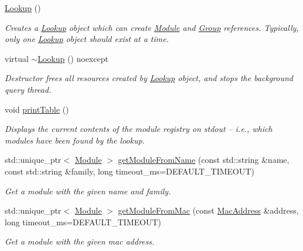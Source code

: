 \begin{DoxyCompactItemize}
\item 
\hyperlink{classhebi_1_1Lookup_acdfa87d652dd197ff578e5ea0f25128c}{Lookup} ()
\begin{DoxyCompactList}\small\item\em Creates a \hyperlink{classhebi_1_1Lookup}{Lookup} object which can create \hyperlink{classhebi_1_1Module}{Module} and \hyperlink{classhebi_1_1Group}{Group} references. Typically, only one \hyperlink{classhebi_1_1Lookup}{Lookup} object should exist at a time. \end{DoxyCompactList}\item 
\mbox{\label{classhebi_1_1Lookup_a7d9e38f258c85bedfd63c71c41d1bd8b}} 
virtual \hyperlink{classhebi_1_1Lookup_a7d9e38f258c85bedfd63c71c41d1bd8b}{$\sim$\+Lookup} () noexcept
\begin{DoxyCompactList}\small\item\em Destructor frees all resources created by \hyperlink{classhebi_1_1Lookup}{Lookup} object, and stops the background query thread. \end{DoxyCompactList}\item 
void \hyperlink{classhebi_1_1Lookup_a52e3d10c45ac8b6c47a7944fee1d7189}{print\+Table} ()
\begin{DoxyCompactList}\small\item\em Displays the current contents of the module registry on stdout -- i.\+e., which modules have been found by the lookup. \end{DoxyCompactList}\item 
std\+::unique\+\_\+ptr$<$ \hyperlink{classhebi_1_1Module}{Module} $>$ \hyperlink{classhebi_1_1Lookup_aaee883fe7e060f0ea0638a09bc49f54b}{get\+Module\+From\+Name} (const std\+::string \&name, const std\+::string \&family, long timeout\+\_\+ms=D\+E\+F\+A\+U\+L\+T\+\_\+\+T\+I\+M\+E\+O\+UT)
\begin{DoxyCompactList}\small\item\em Get a module with the given name and family. \end{DoxyCompactList}\item 
std\+::unique\+\_\+ptr$<$ \hyperlink{classhebi_1_1Module}{Module} $>$ \hyperlink{classhebi_1_1Lookup_ad4078193d720554b57bfd47a46d35231}{get\+Module\+From\+Mac} (const \hyperlink{classhebi_1_1MacAddress}{Mac\+Address} \&address, long timeout\+\_\+ms=D\+E\+F\+A\+U\+L\+T\+\_\+\+T\+I\+M\+E\+O\+UT)
\begin{DoxyCompactList}\small\item\em Get a module with the given mac address. \end{DoxyCompactList}\item 

\end{DoxyCompactItemize}
